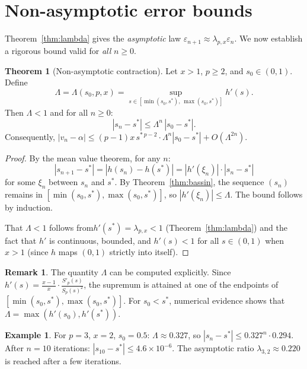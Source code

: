 \documentclass[11pt,a4paper]{article}
\theoremstyle{definition}
\newtheorem{theorem}{Theorem}[section]
\newtheorem{remark}{Remark}[section]
\newtheorem{example}{Example}[section]
\newcommand{\eps}{\varepsilon}
\begin{document}
\section{Non-asymptotic error bounds}
\label{sec:nonasymptotic}

Theorem~\ref{thm:lambda} gives the \emph{asymptotic} law $\eps_{n+1} \approx \lambda_{p,x} \eps_n$. We now establish a rigorous bound valid for \emph{all} $n \geq 0$.

\begin{theorem}[Non-asymptotic contraction]
\label{thm:nonasymp}
Let $x > 1$, $p \geq 2$, and $s_0 \in (0,1)$. Define
\[
  \Lambda = \Lambda(s_0, p, x) = \sup_{s \in [\min(s_0, s^*),\, \max(s_0, s^*)]} h'(s).
\]
Then $\Lambda < 1$ and for all $n \geq 0$:
\begin{equation}
  \label{eq:nonasymp_bound}
  |s_n - s^*| \leq \Lambda^n \, |s_0 - s^*|.
\end{equation}
Consequently, $|v_n - \alpha| \leq (p-1) x\, s^{*\,p-2} \cdot \Lambda^n |s_0 - s^*| + O(\Lambda^{2n})$.
\end{theorem}

\begin{proof}
By the mean value theorem, for any $n$:
\[
  |s_{n+1} - s^*| = |h(s_n) - h(s^*)| = |h'(\xi_n)| \cdot |s_n - s^*|
\]
for some $\xi_n$ between $s_n$ and $s^*$. By Theorem~\ref{thm:bassin}, the sequence $(s_n)$ remains in $[\min(s_0,s^*), \max(s_0,s^*)]$, so $|h'(\xi_n)| \leq \Lambda$. The bound follows by induction.

That $\Lambda < 1$ follows from$h'(s^*) = \lambda_{p,x} < 1$ (Theorem~\ref{thm:lambda}) and the fact that $h'$ is continuous, bounded, and $h'(s) < 1$ for all $s \in (0,1)$ when $x > 1$ (since $h$ maps $(0,1)$ strictly into itself).
\end{proof}

\begin{remark}
The quantity $\Lambda$ can be computed explicitly. Since $h'(s) = \frac{x-1}{x} \cdot \frac{S'_p(s)}{S_p(s)^2}$, the supremum is attained at one of the endpoints of $[\min(s_0, s^*), \max(s_0, s^*)]$. For $s_0 < s^*$, numerical evidence shows that $\Lambda = \max(h'(s_0), h'(s^*))$.
\end{remark}

\begin{example}
For $p = 3$, $x = 2$, $s_0 = 0.5$: $\Lambda \approx 0.327$, so $|s_n - s^*| \leq 0.327^n \cdot 0.294$. After $n = 10$ iterations: $|s_{10} - s^*| \leq 4.6 \times 10^{-6}$. The asymptotic ratio $\lambda_{3,2} \approx 0.220$ is reached after a few iterations.
\end{example}
\end{document}
